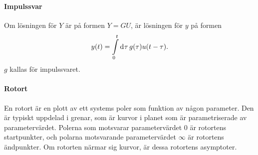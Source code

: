 \paragraph{Impulssvar}
Om lösningen för $Y$ är på formen $Y = GU$, är lösningen för $y$ på formen
\begin{align*}
	y(t) = \int\limits_{0}^{t}\dd[]{\tau}g(\tau)u(t - \tau).
\end{align*}
$g$ kallas för impulssvaret.

\paragraph{Rotort}
En rotort är en plott av ett systems poler som funktion av någon parameter. Den är typiskt uppdelad i grenar, som är kurvor i planet som är parametriserade av parametervärdet. Polerna som motsvarar parametervärdet $0$ är rotortens startpunkter, och polarna motsvarande parametervärdet $\infty$ är rotortens ändpunkter. Om rotorten närmar sig kurvor, är dessa rotortens asymptoter.